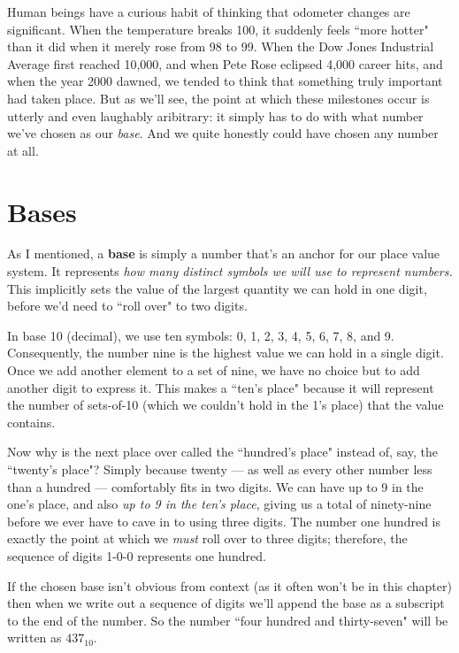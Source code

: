 Human beings have a curious habit of thinking that odometer changes are
significant. When the temperature breaks 100, it suddenly feels ``more
hotter" than it did when it merely rose from 98 to 99. When the Dow Jones
Industrial Average first reached 10,000, and when Pete Rose eclipsed 4,000
career hits, and when the year 2000 dawned, we tended to think that
something truly important had taken place. But as we'll see, the point at
which these milestones occur is utterly and even laughably aribitrary: it
simply has to do with what number we've chosen as our \textit{base}. And we
quite honestly could have chosen any number at all.

\section{Bases}

As I mentioned, a \textbf{base} is simply a number that's an anchor for our
place value system. It represents \textit{how many distinct symbols we
will use to represent numbers.} This implicitly sets the value of the
largest quantity we can hold in one digit, before we'd need to ``roll over"
to two digits.

In base 10 (decimal), we use ten symbols: 0, 1, 2, 3, 4, 5, 6, 7, 8, and 9.
Consequently, the number nine is the highest value we can hold in a single
digit. Once we add another element to a set of nine, we have no choice but
to add another digit to express it. This makes a ``ten's place" because it
will represent the number of sets-of-10 (which we couldn't hold in the 1's
place) that the value contains.

Now why is the next place over called the ``hundred's place" instead of,
say, the ``twenty's place"? Simply because twenty --- as well as every
other number less than a hundred --- comfortably fits in two digits. We can
have up to 9 in the one's place, and also \textit{up to 9 in the ten's
place}, giving us a total of ninety-nine before we ever have to cave in to
using three digits. The number one hundred is exactly the point at which we
\textit{must} roll over to three digits; therefore, the sequence of digits
1-0-0 represents one hundred.

If the chosen base isn't obvious from context (as it often won't be in this
chapter) then when we write out a sequence of digits we'll append the base
as a subscript to the end of the number. So the number ``four hundred and
thirty-seven" will be written as $437_{10}$.

